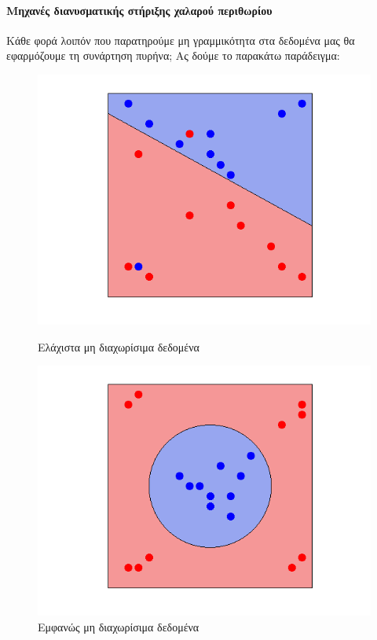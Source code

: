 \documentclass{article}
\begin{document}
\paragraph{Μηχανές διανυσματικής στήριξης χαλαρού περιθωρίου}Κάθε φορά λοιπόν που παρατηρούμε μη γραμμικότητα στα δεδομένα μας θα εφαρμόζουμε τη συνάρτηση
πυρήνα; Ας δούμε το παρακάτω παράδειγμα:
 \begin{figure}[H]
    \centering
    \begin{minipage}{.5\textwidth}
        \centering
        \includegraphics[width=\linewidth, height=0.15\textheight]{soft1.png}
        \caption[Ελάχιστα μη διαχωρίσιμα δεδομένα]{Ελάχιστα μη διαχωρίσιμα δεδομένα}
        
    \end{minipage}%
    \begin{minipage}{0.5\textwidth}
        \centering
        \includegraphics[width=\linewidth, height=0.15\textheight]{soft2.png}
        \caption[Εμφανώς μη διαχωρίσιμα δεδομένα]{Εμφανώς μη διαχωρίσιμα δεδομένα}
       
    \end{minipage}
    \end{figure}
\end{document}

